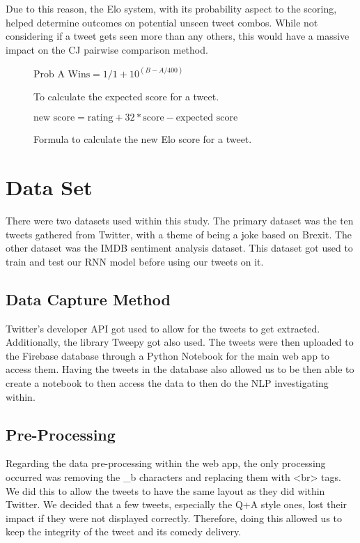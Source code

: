 	Due to this reason, the Elo system, with its probability aspect to the scoring, helped determine outcomes on potential unseen tweet combos. While not considering if a tweet gets seen more than any others, this would have a massive impact on the CJ pairwise comparison method.
	
	
	\begin{figure}[h]
		\centering
		 $\text{Prob A Wins} = 1/1+10^{(B-A/400)}$
		\caption{To calculate the expected score for a tweet.}
		\label{fig:elo_maths_1}
	\end{figure}

\begin{figure}[h]
	\centering

	$\text{new score} = \text{rating} + 32 *  \text{score} - \text{expected score}$
	\caption{Formula to calculate the new Elo score for a tweet.}
	\label{fig:elo_maths_2}
\end{figure}
	
	\section{Data Set}
		There were two datasets used within this study. The primary dataset was the ten tweets gathered from Twitter, with a theme of being a joke based on Brexit. The other dataset was the IMDB sentiment analysis dataset. This dataset got used to train and test our RNN model before using our tweets on it. 
	
	\subsection{Data Capture Method}
		Twitter's developer API got used to allow for the tweets to get extracted. Additionally, the library Tweepy \cite{roesslein2020tweepy} got also used. The tweets were then uploaded to the Firebase database \cite{moroney2017firebase} through a Python Notebook for the main web app to access them. Having the tweets in the database also allowed us to be then able to create a notebook to then access the data to then do the NLP investigating within.
	
	\subsection{Pre-Processing}
		Regarding the data pre-processing within the web app, the only processing occurred was removing the \_b characters and replacing them with <br> tags. We did this to allow the tweets to have the same layout as they did within Twitter. We decided that a few tweets, especially the Q+A style ones, lost their impact if they were not displayed correctly. Therefore, doing this allowed us to keep the integrity of the tweet and its comedy delivery.
	
